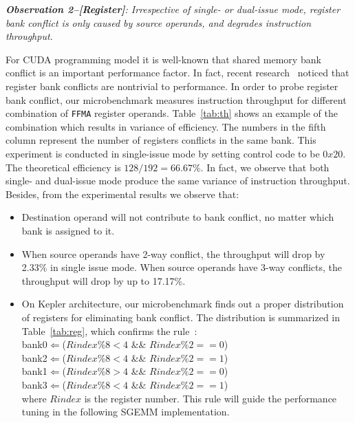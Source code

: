 {\em {\bf Observation 2--[Register]}: Irrespective of single- or dual-issue mode, register bank conflict is only caused 
by source operands, and degrades instruction throughput.}

For CUDA programming model it is well-known that shared memory bank conflict is an important performance factor. In
fact, recent research~\cite{lai} noticed that register bank conflicts are nontrivial to performance.  In order to probe 
register bank conflict, our microbenchmark measures instruction throughput for different combination of {\tt FFMA} 
register operands. Table~\ref{tab:th} shows an example of the combination which results in variance of efficiency. The 
numbers in the fifth column represent the number of registers conflicts in the same bank. This experiment is conducted 
in single-issue mode by setting control code to be $0x20$. The theoretical efficiency is $128/192=66.67\%$. In fact, we 
observe that both single- and dual-issue mode produce the same variance of instruction throughput. Besides, from the 
experimental results we observe that:
\begin{itemize}
\item Destination operand will not contribute to bank conflict, no matter which bank is assigned to it.
\item When source operands have 2-way conflict, the throughput will drop by 2.33\% in single issue
    mode. When source operands have 3-way conflicts, the throughput will drop by up to 17.17\%.

 \item On Kepler architecture, our microbenchmark finds out a proper distribution of registers for eliminating bank
     conflict. The distribution is summarized in Table~\ref{tab:reg}, which confirms the rule~\cite{lai}: \\
 bank0$\Leftarrow$($Rindex \% 8 < 4$ \&\& $Rindex \% 2 == 0$) \\
 bank2$\Leftarrow$($Rindex \% 8 < 4$ \&\&
$Rindex \% 2 == 1$) \\
bank1$\Leftarrow$($Rindex \% 8 > 4$ \&\& $Rindex \%2 == 0$) \\
bank3$\Leftarrow$($Rindex \% 8 < 4$ \&\&
$Rindex\% 2 == 1$)\\
where $Rindex$ is the register number. This rule will guide the performance tuning in the following SGEMM 
implementation.

\end{itemize}

